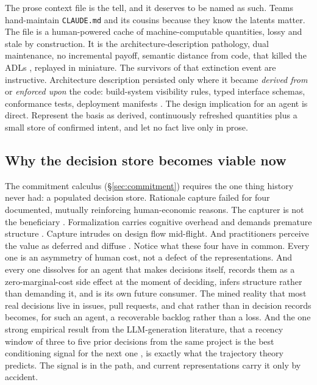 \documentclass[11pt,oneside]{article}
\theoremstyle{definition}
\begin{document}
The prose context file is the tell, and it deserves to be named as such. Teams hand-maintain
\texttt{CLAUDE.md} and its cousins because they know the latents matter. The file is a
human-powered cache of machine-computable quantities, lossy and stale by construction. It is
the architecture-description pathology, dual maintenance, no incremental payoff, semantic
distance from code, that killed the ADLs \cite{malavolta2013}, replayed in miniature. The
survivors of that extinction event are instructive. Architecture description persisted only
where it became \emph{derived from} or \emph{enforced upon} the code: build-system visibility
rules, typed interface schemas, conformance tests, deployment manifests \cite{fitness2017}. The
design implication for an agent is direct. Represent the basis as derived, continuously
refreshed quantities plus a small store of confirmed intent, and let no fact live only in
prose.

\subsection{Why the decision store becomes viable now}

The commitment calculus (\S\ref{sec:commitment}) requires the one thing history never had: a
populated decision store. Rationale capture failed for four documented, mutually reinforcing
human-economic reasons. The capturer is not the beneficiary \cite{grudin1996}. Formalization
carries cognitive overhead and demands premature structure \cite{shipman1999}. Capture intrudes
on design flow mid-flight. And practitioners perceive the value as deferred and diffuse
\cite{tang2006}. Notice what these four have in common. Every one is an asymmetry of human
cost, not a defect of the representations. And every one dissolves for an agent that makes
decisions itself, records them as a zero-marginal-cost side effect at the moment of deciding,
infers structure rather than demanding it, and is its own future consumer. The mined reality
that most real decisions live in issues, pull requests, and chat rather than in decision
records \cite{bhat2017} becomes, for such an agent, a recoverable backlog rather than a loss.
And the one strong empirical result from the LLM-generation literature, that a recency window
of three to five prior decisions from the same project is the best conditioning signal for the
next one \cite{contextmatters2026}, is exactly what the trajectory theory predicts. The signal
is in the path, and current representations carry it only by accident.
\end{document}
